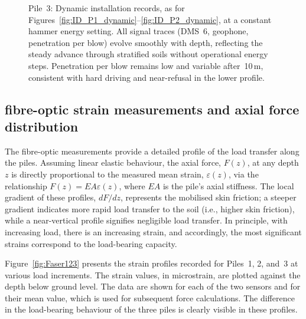 {{{{{\begin{figure*}[!ht]
	\centering
	\caption{Pile~3: Dynamic installation records, as for Figures~\ref{fig:ID_P1_dynamic}--\ref{fig:ID_P2_dynamic}, at a constant hammer energy setting. All signal traces (DMS~6, geophone, penetration per blow) evolve smoothly with depth, reflecting the steady advance through stratified soils without operational energy steps. Penetration per blow remains low and variable after~10\,m, consistent with hard driving and near-refusal in the lower profile.}
	\label{fig:ID_P3_dynamic}
\end{figure*}




\subsection{fibre-optic strain measurements and axial force distribution}
\label{subsec:FO_static}

The fibre-optic measurements provide a detailed profile of the load transfer along the piles. Assuming linear elastic behaviour, the axial force, $F(z)$, at any depth $z$ is directly proportional to the measured mean strain, $\varepsilon(z)$, via the relationship $F(z) = EA \varepsilon(z)$, where $EA$ is the pile's axial stiffness. The local gradient of these profiles, $dF/dz$, represents the mobilised skin friction; a steeper gradient indicates more rapid load transfer to the soil (i.e., higher skin friction), while a near-vertical profile signifies negligible load transfer. In principle, with increasing load, there is an increasing strain, and accordingly, the most significant strains correspond to the load-bearing capacity.

Figure~\ref{fig:Faser123} presents the strain profiles recorded for Piles~1, 2, and~3 at various load increments. The strain values, in microstrain, are plotted against the depth below ground level. The data are shown for each of the two sensors and for their mean value, which is used for subsequent force calculations. The difference in the load-bearing behaviour of the three piles is clearly visible in these profiles.



}}}}}
